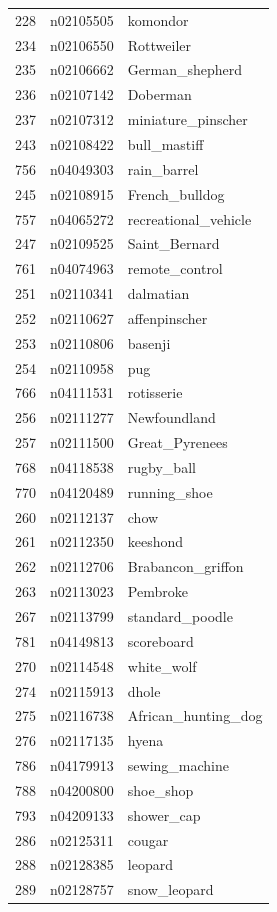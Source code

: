 \begin{table}
\begin{tabular}{cll}
228 & n02105505 & komondor \\
234 & n02106550 & Rottweiler \\
235 & n02106662 & German_shepherd \\
236 & n02107142 & Doberman \\
237 & n02107312 & miniature_pinscher \\
243 & n02108422 & bull_mastiff \\
756 & n04049303 & rain_barrel \\
245 & n02108915 & French_bulldog \\
757 & n04065272 & recreational_vehicle \\
247 & n02109525 & Saint_Bernard \\
761 & n04074963 & remote_control \\
251 & n02110341 & dalmatian \\
252 & n02110627 & affenpinscher \\
253 & n02110806 & basenji \\
254 & n02110958 & pug \\
766 & n04111531 & rotisserie \\
256 & n02111277 & Newfoundland \\
257 & n02111500 & Great_Pyrenees \\
768 & n04118538 & rugby_ball \\
770 & n04120489 & running_shoe \\
260 & n02112137 & chow \\
261 & n02112350 & keeshond \\
262 & n02112706 & Brabancon_griffon \\
263 & n02113023 & Pembroke \\
267 & n02113799 & standard_poodle \\
781 & n04149813 & scoreboard \\
270 & n02114548 & white_wolf \\
274 & n02115913 & dhole \\
275 & n02116738 & African_hunting_dog \\
276 & n02117135 & hyena \\
786 & n04179913 & sewing_machine \\
788 & n04200800 & shoe_shop \\
793 & n04209133 & shower_cap \\
286 & n02125311 & cougar \\
288 & n02128385 & leopard \\
289 & n02128757 & snow_leopard \\

\end{tabular}
\end{table}
